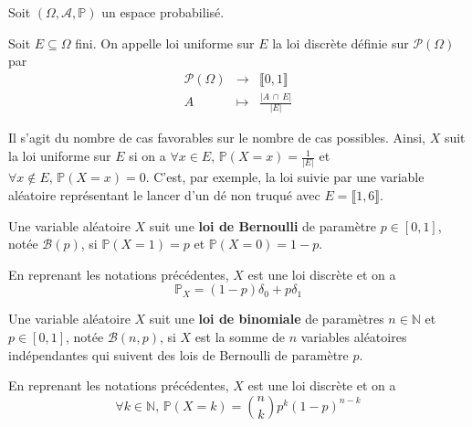   
  Soit $(\Omega, \mathcal{A}, \mathbb{P})$ un espace probabilisé.
  
  \begin{definition}
    Soit $E \subseteq \Omega$ fini. On appelle loi uniforme sur $E$ la loi discrète définie sur $\mathcal{P}(\Omega)$ par
    \[
    \begin{array}{ccc}
      \mathcal{P}(\Omega) &\rightarrow& \llbracket 0, 1 \rrbracket \\
      A &\mapsto& \frac{\vert A \, \cap \, E \vert}{\vert E \vert}
    \end{array}
    \]
  \end{definition}
  
  \begin{remark}
    Il s'agit du nombre de cas favorables sur le nombre de cas possibles. Ainsi, $X$ suit la loi uniforme sur $E$ si on a $\forall x \in E, \, \mathbb{P}(X=x) = \frac{1}{\vert E \vert}$ et $\forall x \notin E, \, \mathbb{P}(X=x) = 0$.
    \newpar
    C'est, par exemple, la loi suivie par une variable aléatoire représentant le lancer d'un dé non truqué avec $E = \llbracket 1, 6 \rrbracket$.
  \end{remark}
  
  \begin{definition}
    Une variable aléatoire $X$ suit une \textbf{loi de Bernoulli} de paramètre $p \in [0,1]$, notée $\mathcal{B}(p)$, si $\mathbb{P}(X=1) = p$ et $\mathbb{P}(X=0)=1-p$.
  \end{definition}
  
  \begin{proposition}
    En reprenant les notations précédentes, $X$ est une loi discrète et on a
    \[ \mathbb{P}_X = (1-p) \delta_0 + p \delta_1 \]
  \end{proposition}
  
  \begin{definition}
    Une variable aléatoire $X$ suit une \textbf{loi de binomiale} de paramètres $n \in \mathbb{N}$ et $p \in [0,1]$, notée $\mathcal{B}(n, p)$, si $X$ est la somme de $n$ variables aléatoires indépendantes qui suivent des lois de Bernoulli de paramètre $p$.
  \end{definition}
  
  \begin{proposition}
    En reprenant les notations précédentes, $X$ est une loi discrète et on a
    \[ \forall k \in \mathbb{N}, \, \mathbb{P}(X = k) = \binom{n}{k} p^k (1-p)^{n-k} \]
  \end{proposition}
  
